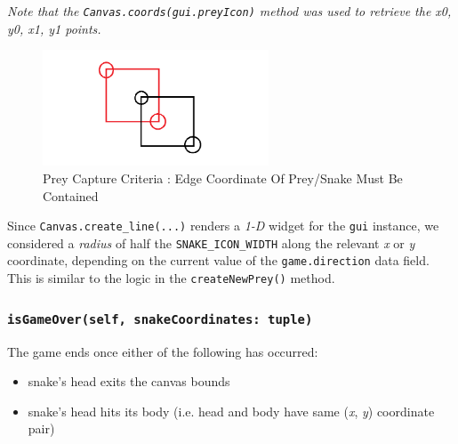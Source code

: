 \documentclass{article}
\begin{document}
\textit{Note that the \texttt{Canvas.coords(gui.preyIcon)} method was used to retrieve the x0, y0, x1, y1 points.}

\begin{figure}[H]
   \centering
    \includegraphics[width=0.6\textwidth]{../PreyCapture.png}
    \caption{Prey Capture Criteria : Edge Coordinate Of Prey/Snake Must Be Contained}
    \label{fig:PreyCapture}
\end{figure}

Since \texttt{Canvas.create\_line(...)} renders a \textit{1-D} widget
for the \texttt{gui} instance, we considered a \textit{radius} of half the \texttt{SNAKE\_ICON\_WIDTH} along the relevant \textit{x} or \textit{y} coordinate, depending on the current value of
the \texttt{game.direction} data field. This is similar to the logic in the \texttt{createNewPrey()} method.

\subsubsection{\texttt{isGameOver(self, snakeCoordinates: tuple)}}\label{sec:Game_Over}
The game ends once either of the following has occurred:
\begin{itemize}
    \item snake's head exits the canvas bounds
    \item snake's head hits its body (i.e. head and body have same (\textit{x}, \textit{y}) coordinate pair)
\end{itemize}
\end{document}
